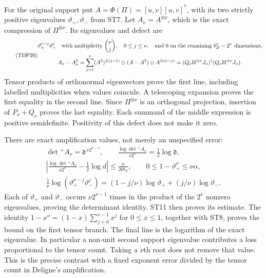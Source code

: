 \documentclass[11pt]{article}
\begin{document}
For the original support put $A=\Phi(\Pi)=[u,v][u,v]^*$, with its two
strictly positive eigenvalues $\vartheta_+,\vartheta_-$ from ST7. Let
$A_\nu=A^{\otimes\nu}$, which is the exact compression of
$\Pi^{\otimes\nu}$. Its eigenvalues and defect are
\begin{equation}\tag{TDP20}
\begin{gathered}
\vartheta_+^{\nu-j}\vartheta_-^j
 \quad\hbox{with multiplicity }{\nu\choose j},\quad 0\le j\le\nu,
 \quad\hbox{and }0\hbox{ on the remaining }b_B^\nu-2^\nu\hbox{ dimensions},\\
A_\nu-A_\nu^2
 =\sum_{j=1}^{\nu}(A^2)^{\otimes(j-1)}\otimes(A-A^2)
 \otimes A^{\otimes(\nu-j)}
 =(Q_\nu\Pi^{\otimes\nu}J_\nu)^\dagger
  (Q_\nu\Pi^{\otimes\nu}J_\nu).
\end{gathered}
\end{equation}
Tensor products of orthonormal eigenvectors prove the first line,
including labelled multiplicities when values coincide. A telescoping
expansion proves the first equality in the second line. Since
$\Pi^{\otimes\nu}$ is an orthogonal projection, insertion of
$P_\nu+Q_\nu$ proves the last equality. Each summand of the middle
expression is positive semidefinite. Positivity of this defect does
not make it zero.

There are exact amplification values, not merely an unspecified error:
\begin{equation}\tag{TDP21}
\begin{gathered}
\det{}^+A_\nu=\mathfrak d^{\,\nu2^{\nu-1}},\qquad
\frac{\log\det{}^+A_\nu}{\nu2^\nu}=\tfrac12\log\mathfrak d,\\
\left|\frac{\log\det{}^+A_\nu}{\nu2^\nu}
 -\tfrac12\log d\right|\le\frac{\alpha}{2\Theta_N},\qquad
0\le1-\vartheta_+^\nu\le\nu\alpha,\\
\frac1\nu\log(\vartheta_+^{\nu-j}\vartheta_-^j)
 =(1-j/\nu)\log\vartheta_++(j/\nu)\log\vartheta_-.
\end{gathered}
\end{equation}
Each of $\vartheta_+$ and $\vartheta_-$ occurs $\nu2^{\nu-1}$ times in
the product of the $2^\nu$ nonzero eigenvalues, proving the determinant
identity. ST11 then proves its estimate. The identity
$1-x^\nu=(1-x)\sum_{j=0}^{\nu-1}x^j$ for $0\le x\le1$, together with
ST8, proves the bound on the first tensor branch. The final line is the
logarithm of the exact eigenvalue. In particular a non-unit second
support eigenvalue contributes a loss proportional to the tensor
count. Taking a $\nu$th root does not remove that value. This is the
precise contrast with a fixed exponent error divided by the tensor
count in Deligne's amplification.
\end{document}
